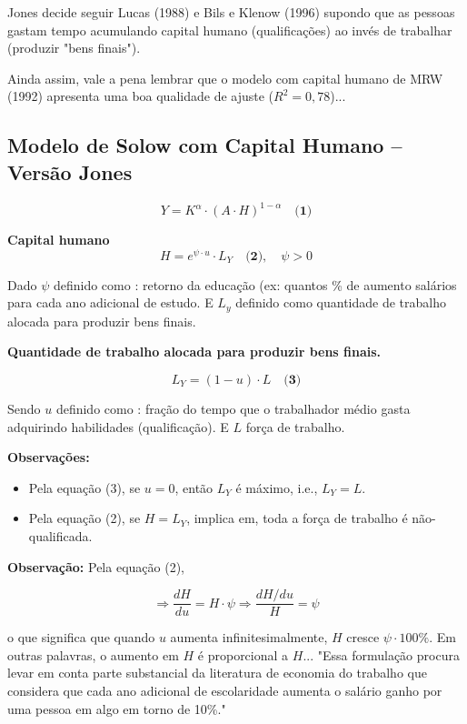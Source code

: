 \documentclass[a4paper,12pt]{article}[abntex2]
\begin{document}
Jones decide seguir Lucas (1988) e Bils e Klenow (1996) supondo que as pessoas gastam tempo acumulando capital humano (qualificações) ao invés de trabalhar (produzir "bens finais").

Ainda assim, vale a pena lembrar que o modelo com capital humano de MRW (1992) apresenta uma boa qualidade de ajuste (\( R^2 = 0,78 \))...

\subsection{\textbf{Modelo de Solow com Capital Humano – Versão Jones}}

\[
Y = K^\alpha \cdot (A \cdot H)^{1-\alpha} \quad \textbf{(1)}
\]

\textbf{Capital humano}
\[
H = e^{\psi \cdot u} \cdot L_Y \quad \textbf{(2)}, \quad \psi > 0
\]

Dado \(\psi\) definido como : retorno da educação (ex: quantos \% de aumento salários para cada ano adicional de estudo. E \(L_y\) definido como quantidade de trabalho alocada para produzir bens finais.

\textbf{Quantidade de trabalho alocada para produzir bens finais.}

\[
L_Y = (1 - u) \cdot L \quad \textbf{(3)}
\]

Sendo \(u\) definido como : fração do tempo que o trabalhador médio gasta adquirindo habilidades (qualificação). E \(L\) força de trabalho.

\textbf{Observações:} 
\begin{itemize}
    \item Pela equação (3), se \( u = 0 \), então \( L_Y \) é máximo, i.e., \( L_Y = L \).
    \item Pela equação (2), se \( H = L_Y \), implica em, toda a força de trabalho é não-qualificada.
\end{itemize}

\textbf{Observação:} Pela equação (2),

\[
\Rightarrow \frac{dH}{du} = H \cdot \psi \Rightarrow \frac{dH/du}{H} = \psi
\]

o que significa que quando \( u \) aumenta infinitesimalmente, \( H \) cresce \( \psi \cdot 100\% \). Em outras palavras, o aumento em \( H \) é proporcional a \( H \)... "Essa formulação procura levar em conta parte substancial da literatura de economia do trabalho que considera que cada ano adicional de escolaridade aumenta o salário ganho por uma pessoa em algo em torno de 10\%."
\end{document}
